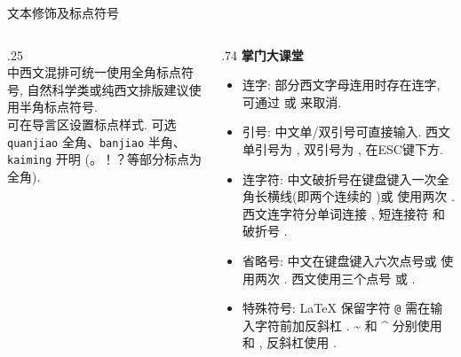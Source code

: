 \begin{frame}{文本修饰及标点符号}
	\begin{columns}[onlytextwidth]
		\begin{column}{.25\textwidth}
			\\[1ex]
			中西文混排可统一使用全角标点符号, \alert{自然科学类}或\alert{纯西文}排版建议使用\alert{半角标点符号}. \\[.5ex]
			\CTeX{}  可在导言区设置标点样式.  可选 \texttt{quanjiao} \alert{全角}、\texttt{banjiao} \alert{半角}、\texttt{kaiming} \alert{开明} (。！？等部分标点为全角).
		\end{column}
		\begin{column}{.74\textwidth}
			\hspace*{1.2em}\textbf{掌门大课堂}
			\begin{itemize}
				\item \alert{连字}: 部分西文字母连用时存在连字, 可通过 \alert{} 或 \alert{} 来取消.
				\item \alert{引号}: 中文单/双引号可直接输入. 西文单引号为 \alert{}, 双引号为 \alert{}, \alert{} 在ESC键下方.
				\item \alert{连字符}: 中文破折号在键盘键入\alert{一次全角长横线}(即两个连续的 \alert{} )或 使用\alert{两次} . 西文连字符分单词连接 \alert{\fverb{-}}, 短连接符 \alert{\fverb{--}} 和破折号 \alert{\fverb{---}}.
				\item \alert{省略号}: 中文在键盘键入\alert{六次点号}或 使用\alert{两次} . 西文使用\alert{三个点号} 或 .
				\item \alert{特殊符号}: \LaTeX{} 保留字符 \alert{\texttt{@}} \alert{\fverb{\#}} \alert{\fverb{\$}} \alert{\fverb{\%}} \alert{\fverb{\&}} \alert{\fverb{\{}} \alert{\fverb{\}}} \alert{\fverb{\_}} 需在输入字符前加反斜杠 \alert{\fverb{\textbackslash}}. \alert{\textasciitilde} 和 \alert{\textasciicircum} 分别使用  和 , 反斜杠使用 .
			\end{itemize}
		\end{column}
	\end{columns}
\end{frame}

